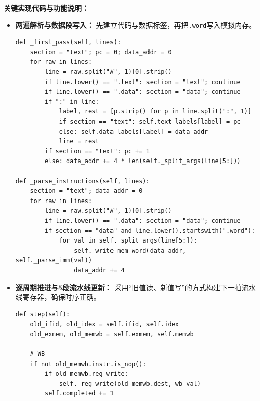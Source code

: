 \documentclass[12pt,a4paper]{ctexart}
\begin{document}
\textbf{关键实现代码与功能说明：}
\begin{itemize}
	\item \textbf{两遍解析与数据段写入：} 先建立代码与数据标签，再把\texttt{.word}写入模拟内存。
\begin{lstlisting}
def _first_pass(self, lines):
	section = "text"; pc = 0; data_addr = 0
	for raw in lines:
		line = raw.split("#", 1)[0].strip()
		if line.lower() == ".text": section = "text"; continue
		if line.lower() == ".data": section = "data"; continue
		if ":" in line:
			label, rest = [p.strip() for p in line.split(":", 1)]
			if section == "text": self.text_labels[label] = pc
			else: self.data_labels[label] = data_addr
			line = rest
		if section == "text": pc += 1
		else: data_addr += 4 * len(self._split_args(line[5:]))

def _parse_instructions(self, lines):
	section = "text"; data_addr = 0
	for raw in lines:
		line = raw.split("#", 1)[0].strip()
		if line.lower() == ".data": section = "data"; continue
		if section == "data" and line.lower().startswith(".word"):
			for val in self._split_args(line[5:]):
				self._write_mem_word(data_addr, self._parse_imm(val))
				data_addr += 4
\end{lstlisting}
	\item \textbf{逐周期推进与5段流水线更新：} 采用“旧值读、新值写”的方式构建下一拍流水线寄存器，确保时序正确。
\begin{lstlisting}
def step(self):
	old_ifid, old_idex = self.ifid, self.idex
	old_exmem, old_memwb = self.exmem, self.memwb

	# WB
	if not old_memwb.instr.is_nop():
		if old_memwb.reg_write:
			self._reg_write(old_memwb.dest, wb_val)
		self.completed += 1


\end{lstlisting}
\end{itemize}
\end{document}

